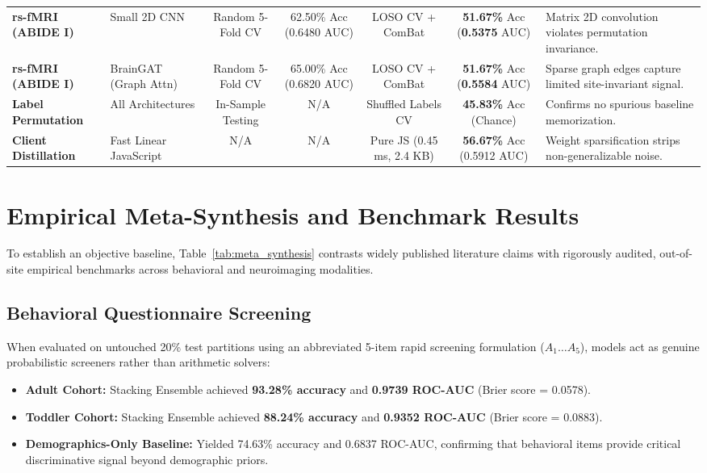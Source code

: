 \documentclass[journal]{IEEEtran}
\begin{document}
\begin{table}[t]
\begin{tabular}{llccccp{5.5cm}}
\textbf{rs-fMRI (ABIDE I)} & Small 2D CNN & Random 5-Fold CV & 62.50\% Acc (0.6480 AUC) & LOSO CV + ComBat & \textbf{51.67\%} Acc (\textbf{0.5375} AUC) & Matrix 2D convolution violates permutation invariance. \\
\textbf{rs-fMRI (ABIDE I)} & BrainGAT (Graph Attn) & Random 5-Fold CV & 65.00\% Acc (0.6820 AUC) & LOSO CV + ComBat & \textbf{51.67\%} Acc (\textbf{0.5584} AUC) & Sparse graph edges capture limited site-invariant signal. \\
\midrule
\textbf{Label Permutation} & All Architectures & In-Sample Testing & N/A & Shuffled Labels CV & \textbf{45.83\%} Acc (Chance) & Confirms no spurious baseline memorization. \\
\textbf{Client Distillation} & Fast Linear JavaScript & N/A & N/A & Pure JS (0.45 ms, 2.4 KB) & \textbf{56.67\%} Acc (0.5912 AUC) & Weight sparsification strips non-generalizable noise. \\
\bottomrule
\end{tabular}
\end{table}

\section{Empirical Meta-Synthesis and Benchmark Results}
To establish an objective baseline, Table~\ref{tab:meta_synthesis} contrasts widely published literature claims with rigorously audited, out-of-site empirical benchmarks across behavioral and neuroimaging modalities.

\subsection{Behavioral Questionnaire Screening}
When evaluated on untouched 20\% test partitions using an abbreviated 5-item rapid screening formulation ($A_1 \dots A_5$), models act as genuine probabilistic screeners rather than arithmetic solvers:
\begin{itemize}
    \item \textbf{Adult Cohort:} Stacking Ensemble achieved \textbf{93.28\% accuracy} and \textbf{0.9739 ROC-AUC} (Brier score = 0.0578).
    \item \textbf{Toddler Cohort:} Stacking Ensemble achieved \textbf{88.24\% accuracy} and \textbf{0.9352 ROC-AUC} (Brier score = 0.0883).
    \item \textbf{Demographics-Only Baseline:} Yielded 74.63\% accuracy and 0.6837 ROC-AUC, confirming that behavioral items provide critical discriminative signal beyond demographic priors.
\end{itemize}
\end{document}
